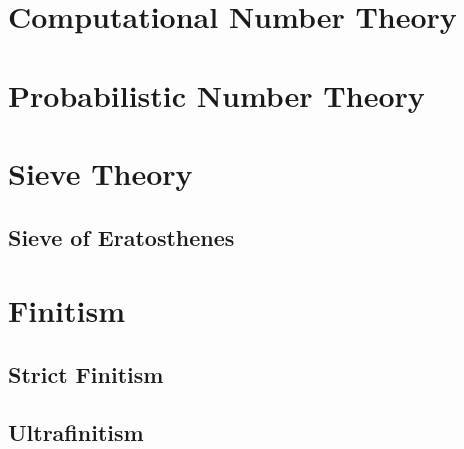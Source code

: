 \section{Computational Number Theory}\label{sec:computational_number_theory}

\section{Probabilistic Number Theory}\label{sec:probabilistic_number_theory}

\section{Sieve Theory}\label{sec:sieve_theory}

\subsection{Sieve of Eratosthenes}\label{sec:sieve}



\section{Finitism}\label{sec:finitism}

\subsection{Strict Finitism}\label{sec:strict_finitism}

\subsection{Ultrafinitism}\label{sec:ultrafinitism}
